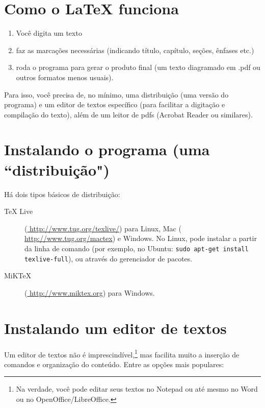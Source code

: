 \documentclass[a4paper,numbers=noenddot,abstract,DIV=calc]{scrbook} %
\begin{document}
\section{Como o LaTeX funciona}
 
 \begin{enumerate}
 \item  Você digita um texto \item faz as marcações necessárias (indicando título, capítulo, seções, ênfases etc.) \item  roda o programa para gerar o produto final (um texto diagramado em .pdf ou outros formatos menos usuais).
 \end{enumerate}


Para isso, você precisa de, no mínimo, uma distribuição (uma versão do programa) e um editor de textos específico  (para facilitar a digitação e compilação do texto), além de um leitor de pdfs (Acrobat Reader ou similares).



\section{Instalando o programa (uma ``distribuição")}
\label{distribuicoes}
Há dois tipos básicos de distribuição:
\begin{description}
\item [TeX Live] (\url{ http://www.tug.org/texlive/}) para Linux, Mac  (\url{ http://www.tug.org/mactex}) e Windows. No Linux, pode instalar a partir da linha de comando (por exemplo, no Ubuntu: \texttt{sudo apt-get install texlive-full}), ou através do gerenciador de pacotes. 
\item[MiKTeX]  (\url{ http://www.miktex.org}) para Windows.

\end{description}

\section{Instalando um editor de textos}
\label{editor-de-textos}
Um editor de textos não é imprescindível,\footnote{Na verdade, você pode editar seus textos no Notepad ou até mesmo no Word ou no OpenOffice/LibreOffice.} mas facilita muito a inserção de comandos e organização do conteúdo. Entre as opções mais populares:
\end{document}
